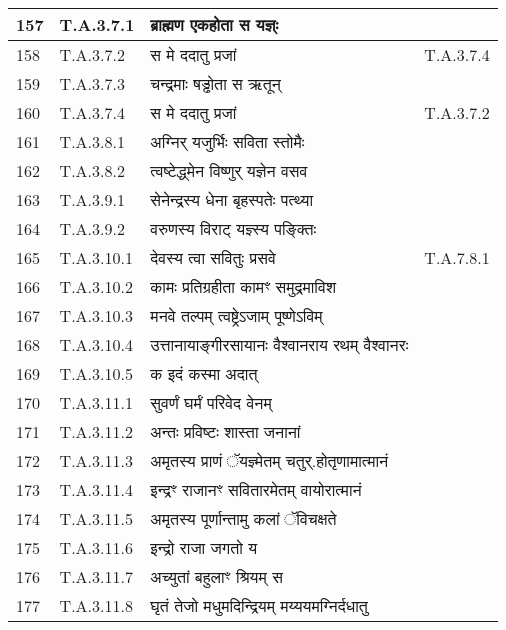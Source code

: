 \documentclass[17pt]{extarticle}
\begin{document}
\begin{longtable}{||p{0.4in}||p{0.9in}||p{4.0in}||p{0.9in}||}
        \hline
            157 & T.A.3.7.1 & ब्राह्मण एकहोता स यज्ञ्ः &      \\
        \hline
            158 & T.A.3.7.2 & स मे ददातु प्रजां &  T.A.3.7.4       \\
        \hline
            159 & T.A.3.7.3 & चन्द्रमाः षड्ढोता स ऋतून् &      \\
        \hline
            160 & T.A.3.7.4 & स मे ददातु प्रजां & T.A.3.7.2        \\
        \hline
            161 & T.A.3.8.1 & अग्निर् यजुर्भिः सविता स्तोमैः &      \\
        \hline
            162 & T.A.3.8.2 & त्वष्टेद्ध्मेन विष्णुर् यज्ञेन वसव &      \\
        \hline
            163 & T.A.3.9.1 & सेनेन्द्रस्य धेना बृहस्पतेः पत्थ्या &      \\
        \hline
            164 & T.A.3.9.2 & वरुणस्य विराट् यज्ञ्स्य पङ्क्तिः &      \\
        \hline
            165 & T.A.3.10.1 & देवस्य त्वा सवितुः प्रसवे &  T.A.7.8.1       \\
        \hline
            166 & T.A.3.10.2 & कामः प्रतिग्रहीता कामꣳ समुद्रमाविश &      \\
        \hline
            167 & T.A.3.10.3 & मनवे तल्पम् त्वष्ट्रेऽजाम् पूष्णेऽविम् &      \\
        \hline
            168 & T.A.3.10.4 & उत्तानायाङ्गीरसायानः वैश्वानराय रथम् वैश्वानरः &      \\
        \hline
            169 & T.A.3.10.5 & क इदं कस्मा अदात् &      \\
        \hline
            170 & T.A.3.11.1 & सुवर्णं घर्मं परिवेद वेनम् &      \\
        \hline
            171 & T.A.3.11.2 & अन्तः प्रविष्टः शास्ता जनानां &      \\
        \hline
            172 & T.A.3.11.3 & अमृतस्य प्राणं ॅयज्ञ्मेतम् चतुर्.होतृणामात्मानं &      \\
        \hline
            173 & T.A.3.11.4 & इन्द्रꣳ राजानꣳ सवितारमेतम् वायोरात्मानं &      \\
        \hline
            174 & T.A.3.11.5 & अमृतस्य पूर्णान्तामु कलां ॅविचक्षते &      \\
        \hline
            175 & T.A.3.11.6 & इन्द्रो राजा जगतो य &      \\
        \hline
            176 & T.A.3.11.7 & अच्युतां बहुलाꣳ श्रियम् स &      \\
        \hline
            177 & T.A.3.11.8 & घृतं तेजो मधुमदिन्द्रियम् मय्ययमग्निर्दधातु &      \\

\end{longtable}
\end{document}
